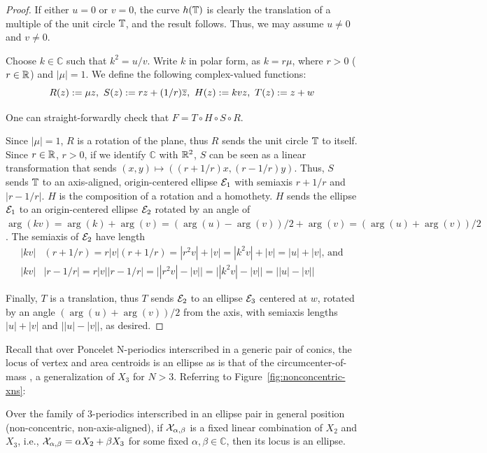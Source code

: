 \begin{proof}
If either $u=0$ or $v=0$, the curve $h(\mathbb{T})$ is clearly the translation of a multiple of the unit circle $\mathbb{T}$, and the result follows. Thus, we may assume $u\neq 0$ and $v\neq 0$.

Choose $k\in\mathbb{C}$ such that $k^2=u/v$. Write $k$ in polar form, as $k=r \mu$, where $r>0$ ($r\in\mathbb{R}$) and $|\mu|=1$. We define the following complex-valued functions:
\[R(z):=\mu z,~ S(z):=r z+(1/r) \overline{z},~ H(z):=k v z,~ T(z):=z+w\]

One can straight-forwardly check that $F=T\circ H\circ S\circ R$.

Since $|\mu|=1$, $R$ is a rotation of the plane, thus $R$ sends the unit circle $\mathbb{T}$ to itself. Since $r\in\mathbb{R}$, $r>0$, if we identify $\mathbb{C}$ with $\mathbb{R}^2$, $S$ can be seen as a linear transformation that sends $(x,y)\mapsto\left(\left(r+1/r\right)x,\left(r-1/r\right)y\right)$. Thus, $S$ sends $\mathbb{T}$ to an axis-aligned, origin-centered ellipse $\mathcal{E}_1$ with semiaxis $r+1/r$ and $|r-1/r|$. $H$ is the composition of a rotation and a homothety. $H$ sends the ellipse $\mathcal{E}_1$ to an origin-centered ellipse $\mathcal{E}_2$ rotated by an angle of $\arg(k v)=\arg(k)+\arg(v)=(\arg(u)-\arg(v))/2+\arg(v)=(\arg(u)+\arg(v))/2$. The semiaxis of $\mathcal{E}_2$ have length
\begin{align*}
|k v|&(r+1/r)=r|v|(r+1/r)=|r^2 v|+|v|=|k^2 v|+|v|=|u|+|v|\text{, and}\\
|k v|&|r-1/r|=r|v||r-1/r|=\big||r^2 v|-|v|\big|=\big||k^2 v|-|v|\big|=\big||u|-|v|\big|
\end{align*}

Finally, $T$ is a translation, thus $T$ sends $\mathcal{E}_2$ to an ellipse $\mathcal{E}_3$ centered at $w$, rotated by an angle $(\arg(u)+\arg(v))/2$ from the axis, with semiaxis lengths $|u|+|v|$ and $\big||u|-|v|\big|$, as desired.
\end{proof}

Recall that over Poncelet N-periodics interscribed in a generic pair of conics, the locus of vertex and area centroids is an ellipse \cite{sergei2016-com} as is that of the circumcenter-of-mass \cite{sergei2014-circumcenter-of-mass}, a generalization of $X_3$ for $N>3$. Referring to Figure~\ref{fig:nonconcentric-xns}:

\begin{theorem}
Over the family of 3-periodics interscribed in an ellipse pair in general position (non-concentric, non-axis-aligned),
if $\mathcal{X}_{\alpha,\beta}$ is a fixed linear combination of $X_2$ and $X_3$, i.e., $\mathcal{X}_{\alpha,\beta}=\alpha X_2+\beta X_3$ for some fixed $\alpha,\beta\in\mathbb{C}$, then its locus is an ellipse. 
\label{thm:ellipse-locus}
\end{theorem}

